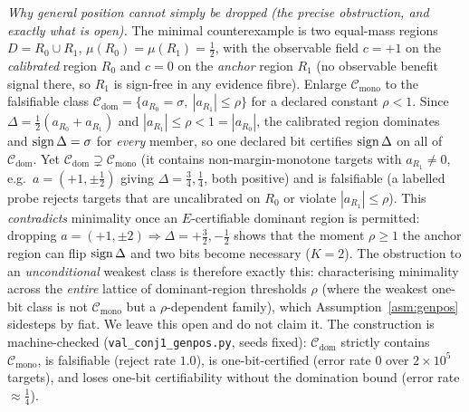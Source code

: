 \begin{remark}
\smallskip
\noindent\emph{Why general position cannot simply be dropped (the precise obstruction, and
exactly what is open).} The minimal counterexample is two equal-mass regions
$D=R_0\cup R_1$, $\mu(R_0)=\mu(R_1)=\tfrac12$, with the observable field $c=+1$ on the
\emph{calibrated} region $R_0$ and $c=0$ on the \emph{anchor} region $R_1$ (no observable benefit
signal there, so $R_1$ is sign-free in any evidence fibre). Enlarge $\mathcal C_{\mathrm{mono}}$ to
the falsifiable class $\mathcal C_{\mathrm{dom}}=\{a_{R_0}=\sigma,\ |a_{R_1}|\le\rho\}$ for a
declared constant $\rho<1$. Since $\Delta=\tfrac12(a_{R_0}+a_{R_1})$ and $|a_{R_1}|\le\rho<1=|a_{R_0}|$,
the calibrated region dominates and $\operatorname{sign}\Delta=\sigma$ for \emph{every} member, so one declared
bit certifies $\operatorname{sign}\Delta$ on all of $\mathcal C_{\mathrm{dom}}$. Yet $\mathcal C_{\mathrm{dom}}
\supsetneq\mathcal C_{\mathrm{mono}}$ (it contains non-margin-monotone targets with $a_{R_1}\neq0$,
e.g.\ $a=(+1,\pm\tfrac12)$ giving $\Delta=\tfrac34,\tfrac14$, both positive) and is falsifiable (a
labelled probe rejects targets that are uncalibrated on $R_0$ or violate $|a_{R_1}|\le\rho$). This
\emph{contradicts} minimality once an $E$-certifiable dominant region is permitted: dropping
$a=(+1,\pm2)\Rightarrow\Delta=+\tfrac32,-\tfrac12$ shows that the moment $\rho\ge1$ the anchor
region can flip $\operatorname{sign}\Delta$ and two bits become necessary ($K{=}2$). The obstruction to an
\emph{unconditional} weakest class is therefore exactly this: characterising minimality across the
\emph{entire} lattice of dominant-region thresholds $\rho$ (where the weakest one-bit class is not
$\mathcal C_{\mathrm{mono}}$ but a $\rho$-dependent family), which Assumption~\ref{asm:genpos}
sidesteps by fiat. We leave this open and do not claim it. The construction is machine-checked
(\texttt{val\_conj1\_genpos.py}, seeds fixed): $\mathcal C_{\mathrm{dom}}$ strictly contains
$\mathcal C_{\mathrm{mono}}$, is falsifiable (reject rate $1.0$), is one-bit-certified (error rate
$0$ over $2\times10^5$ targets), and loses one-bit certifiability without the domination bound
(error rate $\approx\tfrac14$).
\end{remark}

